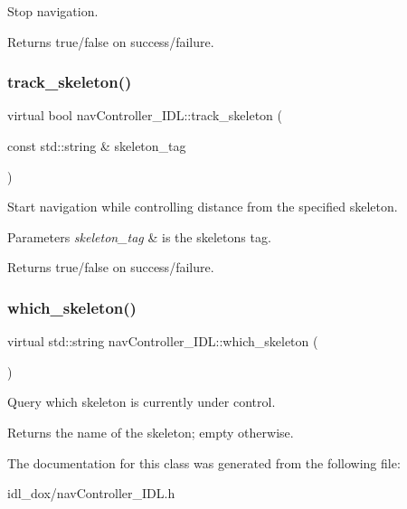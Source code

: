 Stop navigation. 

\begin{DoxyReturn}{Returns}
true/false on success/failure. 
\end{DoxyReturn}
\mbox{\label{classnavController__IDL_a09b17abbbfc5129f86de9f9bb2c5e230}} 
\subsubsection{\texorpdfstring{track\_skeleton()}{track\_skeleton()}}
{\footnotesize\ttfamily virtual bool nav\+Controller\+\_\+\+I\+D\+L\+::track\+\_\+skeleton (\begin{DoxyParamCaption}\item[{const std\+::string \&}]{skeleton\+\_\+tag }\end{DoxyParamCaption})\hspace{0.3cm}{\ttfamily [virtual]}}



Start navigation while controlling distance from the specified skeleton. 


\begin{DoxyParams}{Parameters}
{\em skeleton\+\_\+tag} & is the skeleton\textquotesingle{}s tag. \\
\hline
\end{DoxyParams}
\begin{DoxyReturn}{Returns}
true/false on success/failure. 
\end{DoxyReturn}
\mbox{\label{classnavController__IDL_ae7a1cd7d5d35831bf7851a9cf15577c8}} 
\subsubsection{\texorpdfstring{which\_skeleton()}{which\_skeleton()}}
{\footnotesize\ttfamily virtual std\+::string nav\+Controller\+\_\+\+I\+D\+L\+::which\+\_\+skeleton (\begin{DoxyParamCaption}{ }\end{DoxyParamCaption})\hspace{0.3cm}{\ttfamily [virtual]}}



Query which skeleton is currently under control. 

\begin{DoxyReturn}{Returns}
the name of the skeleton; empty otherwise. 
\end{DoxyReturn}


The documentation for this class was generated from the following file\+:\begin{DoxyCompactItemize}
\item 
idl\+\_\+dox/nav\+Controller\+\_\+\+I\+D\+L.\+h\end{DoxyCompactItemize}
